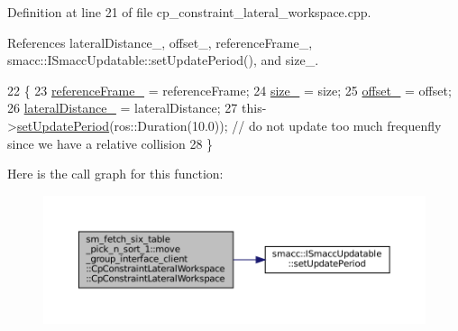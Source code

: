 Definition at line 21 of file cp\+\_\+constraint\+\_\+lateral\+\_\+workspace.\+cpp.



References lateral\+Distance\+\_\+, offset\+\_\+, reference\+Frame\+\_\+, smacc\+::\+I\+Smacc\+Updatable\+::set\+Update\+Period(), and size\+\_\+.


\begin{DoxyCode}
22         \{
23             \hyperlink{classsm__fetch__six__table__pick__n__sort__1_1_1move__group__interface__client_1_1CpConstraintLateralWorkspace_a00a2521553405d97ad2ff89aefd777cf}{referenceFrame\_} = referenceFrame;
24             \hyperlink{classsm__fetch__six__table__pick__n__sort__1_1_1move__group__interface__client_1_1CpConstraintLateralWorkspace_abcbeb3207f5e30503b9422654a3ec773}{size\_} = size;
25             \hyperlink{classsm__fetch__six__table__pick__n__sort__1_1_1move__group__interface__client_1_1CpConstraintLateralWorkspace_ab39604f3fecbe836b1818bd72488527e}{offset\_} = offset;
26             \hyperlink{classsm__fetch__six__table__pick__n__sort__1_1_1move__group__interface__client_1_1CpConstraintLateralWorkspace_adf1bc181cbcfc0e4d848754c70e436fc}{lateralDistance\_} = lateralDistance;
27             this->\hyperlink{classsmacc_1_1ISmaccUpdatable_a88f3b092a81b2d8810a9776c8c69855b}{setUpdatePeriod}(ros::Duration(10.0)); \textcolor{comment}{// do not update too much frequenfly
       since we have a relative collision}
28         \}
\end{DoxyCode}
Here is the call graph for this function\+:
\nopagebreak
\begin{figure}[H]
\begin{center}
\leavevmode
\includegraphics[width=350pt]{classsm__fetch__six__table__pick__n__sort__1_1_1move__group__interface__client_1_1CpConstraintLateralWorkspace_a60e0d35490d98af681e623a4dfd99b53_cgraph}
\end{center}
\end{figure}


